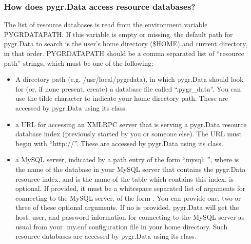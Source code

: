 \documentclass{howto}
\begin{document}
\subsubsection{How does pygr.Data access resource databases?}
The list of resource databases is read from the environment variable
PYGRDATAPATH.  If this variable is empty or missing, the default path
for pygr.Data to search is the user's home directory (\$HOME) and
current directory, in that order.  PYGRDATAPATH should be a comma separated list
of ``resource path'' strings, which must be one of the following:
\begin{itemize}
\item A directory path (e.g. /usr/local/pygrdata), in which pygr.Data should
look for (or, if none present, create) a database file called ``.pygr_data''.  
You can use the tilde character to indicate your home directory path.
These are accessed by pygr.Data using its  class.

\item a URL for accessing an XMLRPC server that is serving a pygr.Data
resource database index (previously started by you or someone else).
The URL must begin with ``http://''.
These are accessed by pygr.Data using its  class.

\item a MySQL server, indicated by a path entry of the form 
``mysql: '',
where  is the name of the database in your MySQL
server that contains the pygr.Data resource index,
and  is the name of the table which contains this index.
 is optional.  If provided, it must be a whitespace separated 
list of arguments for connecting to the MySQL server, of the form
  .  You can provide one, two
or three of these optional arguments.  If no  is provided,
pygr.Data will get the host, user, and password information for connecting 
to the MySQL server as usual from your
.my.cnf configuration file in your home directory.
Such resource databases are accessed by pygr.Data using its 
 class.
\end{itemize}
\end{document}

